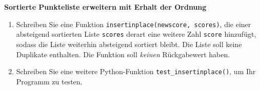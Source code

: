 \textbf{Sortierte Punkteliste erweitern mit Erhalt der Ordnung}
\begin{enumerate}
	\item Schreiben Sie eine Funktion \verb|insertinplace(newscore, scores)|, die einer absteigend sortierten Liste \verb|scores| derart eine weitere Zahl \verb|score| hinzufügt, sodass die Liste weiterhin absteigend sortiert bleibt. Die Liste soll keine Duplikate enthalten. Die Funktion soll \textit{keinen} Rückgabewert haben.
	\item Schreiben Sie eine weitere Python-Funktion \verb|test_insertinplace()|, um Ihr Programm zu testen.
\end{enumerate}